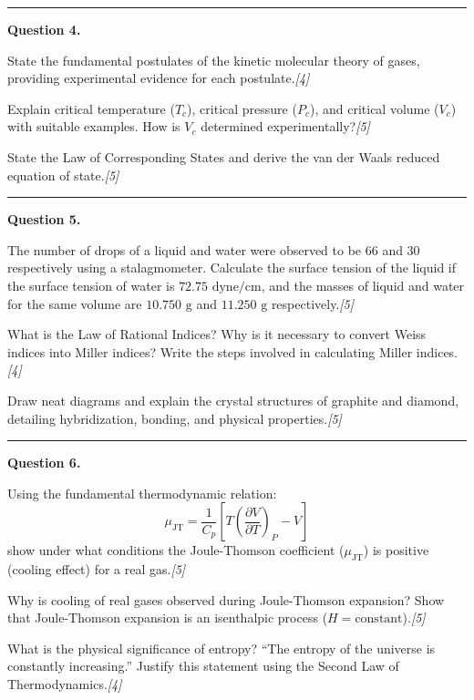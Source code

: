 \documentclass[11pt,a4paper]{article}
\newcommand{\pts}[1]{\hfill   \textit{[#1]}}
\begin{document}
\medskip\rule{\linewidth}{0.2pt}\medskip




\noindent   \textbf{Question 4.}

\begin{parts}
  \item State the fundamental postulates of the kinetic molecular theory of gases, providing experimental evidence for each postulate.\pts{4}
  \item Explain critical temperature ($T_c$), critical pressure ($P_c$), and critical volume ($V_c$) with suitable examples. How is $V_c$ determined experimentally?\pts{5}
  \item State the Law of Corresponding States and derive the van der Waals reduced equation of state.\pts{5}
\end{parts}

\medskip\rule{\linewidth}{0.2pt}\medskip




\noindent   \textbf{Question 5.}

\begin{parts}
  \item The number of drops of a liquid and water were observed to be 66 and 30 respectively using a stalagmometer. Calculate the surface tension of the liquid if the surface tension of water is $72.75  \text{ dyne/cm}$, and the masses of liquid and water for the same volume are $10.750  \text{ g}$ and $11.250  \text{ g}$ respectively.\pts{5}
  \item What is the Law of Rational Indices? Why is it necessary to convert Weiss indices into Miller indices? Write the steps involved in calculating Miller indices.\pts{4}
  \item Draw neat diagrams and explain the crystal structures of graphite and diamond, detailing hybridization, bonding, and physical properties.\pts{5}
\end{parts}

\medskip\rule{\linewidth}{0.2pt}\medskip




\noindent   \textbf{Question 6.}

\begin{parts}
  \item Using the fundamental thermodynamic relation:
  \[
    \mu_{ \text{JT}} = \frac{1}{C_p} \left[ T \left( \frac{\partial V}{\partial T} \right)_P - V \right]
  \]
  show under what conditions the Joule-Thomson coefficient ($\mu_{ \text{JT}}$) is positive (cooling effect) for a real gas.\pts{5}
  \item Why is cooling of real gases observed during Joule-Thomson expansion? Show that Joule-Thomson expansion is an isenthalpic process ($H =  \text{constant}$).\pts{5}
  \item What is the physical significance of entropy? ``The entropy of the universe is constantly increasing.'' Justify this statement using the Second Law of Thermodynamics.\pts{4}
\end{parts}
\end{document}
